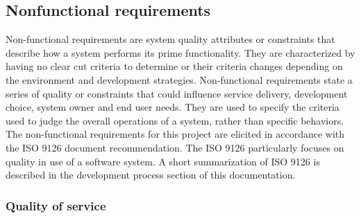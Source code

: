 \newpage
\subsection{Nonfunctional requirements}
Non-functional requirements are system quality attributes or constraints that describe how a system performs its prime functionality.
They are characterized by having no clear cut criteria to determine or their criteria
changes depending on the environment and development strategies\cite{req:requirements-technique2}.
Non-functional requirements state a series of quality or constraints that could influence service delivery,
development choice, system owner and end user needs.
They are used to specify the criteria used to judge the overall operations of a system,
rather than specific behaviors.
The non-functional requirements for this project are elicited in accordance with the ISO 9126 document recommendation.
The ISO 9126 particularly focuses on quality in use of a software system.
A short summarization of ISO 9126 is described in the development process section of this documentation.
\\[0.4cm]

\subsubsection{Quality of service}
%
